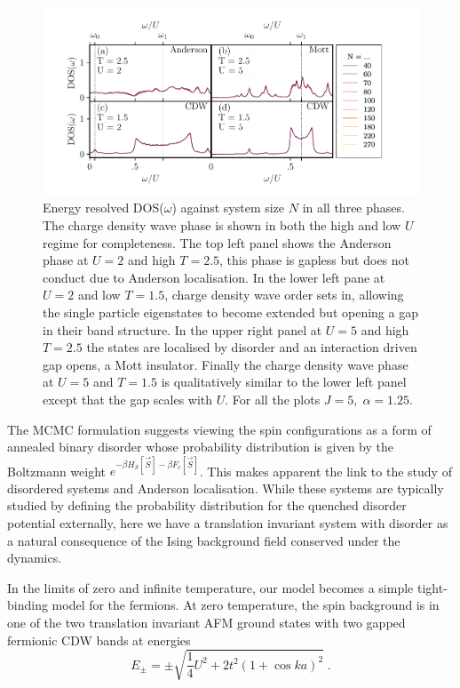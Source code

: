 \hypertarget{fig:DOS}{%
\begin{figure}
\centering
\includegraphics[width=1\textwidth,height=\textheight]{figure_code/fk_chapter/DOS/DOS}
\caption[{Energy resolved DOS(\(\omega\)) and \(\tau\) (the scaling exponent of IPR(\(\omega\)) against system size \(N\)).}]{Energy resolved DOS(\(\omega\)) against system size \(N\) in all three phases. The charge density wave phase is shown in both the high and low \(U\) regime for completeness. The top left panel shows the Anderson phase at \(U = 2\) and high \(T = 2.5\), this phase is gapless but does not conduct due to Anderson localisation. In the lower left pane at \(U = 2\) and low \(T = 1.5\), charge density wave order sets in, allowing the single particle eigenstates to become extended but opening a gap in their band structure. In the upper right panel at \(U = 5\) and high \(T = 2.5\) the states are localised by disorder and an interaction driven gap opens, a Mott insulator. Finally the charge density wave phase at \(U = 5\) and \(T = 1.5\) is qualitatively similar to the lower left panel except that the gap scales with \(U\). For all the plots \(J = 5,\;\alpha = 1.25\).}
\label{fig:DOS}
\end{figure}
}

The MCMC formulation suggests viewing the spin configurations as a form of annealed binary disorder whose probability distribution is given by the Boltzmann weight \(e^{-\beta H_S[\vec{S}] - \beta F_c[\vec{S}]}\). This makes apparent the link to the study of disordered systems and Anderson localisation. While these systems are typically studied by defining the probability distribution for the quenched disorder potential externally, here we have a translation invariant system with disorder as a natural consequence of the Ising background field conserved under the dynamics.

In the limits of zero and infinite temperature, our model becomes a simple tight-binding model for the fermions. At zero temperature, the spin background is in one of the two translation invariant AFM ground states with two gapped fermionic CDW bands at energies \[E_{\pm} = \pm\sqrt{\frac{1}{4}U^2 + 2t^2(1 + \cos ka)^2}\;.\]

